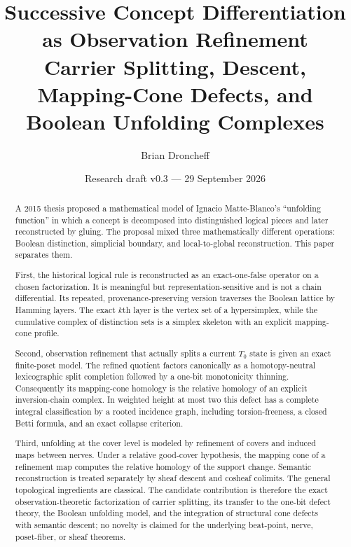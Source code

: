 \documentclass[11pt]{article}
\title{\textbf{Successive Concept Differentiation as Observation Refinement}\\
\large Carrier Splitting, Descent, Mapping-Cone Defects, and Boolean Unfolding Complexes}
\author{Brian Droncheff}
\date{Research draft v0.3 --- 29 September 2026}
\begin{document}
\maketitle

\begin{abstract}
A 2015 thesis proposed a mathematical model of Ignacio Matte-Blanco's ``unfolding function'' in which a concept is decomposed into distinguished logical pieces and later reconstructed by gluing.  The proposal mixed three mathematically different operations: Boolean distinction, simplicial boundary, and local-to-global reconstruction.  This paper separates them.

First, the historical logical rule is reconstructed as an exact-one-false operator on a chosen factorization.  It is meaningful but representation-sensitive and is not a chain differential.  Its repeated, provenance-preserving version traverses the Boolean lattice by Hamming layers.  The exact $k$th layer is the vertex set of a hypersimplex, while the cumulative complex of distinction sets is a simplex skeleton with an explicit mapping-cone profile.

Second, observation refinement that actually splits a current $T_0$ state is given an exact finite-poset model.  The refined quotient factors canonically as a homotopy-neutral lexicographic split completion followed by a one-bit monotonicity thinning.  Consequently its mapping-cone homology is the relative homology of an explicit inversion-chain complex.  In weighted height at most two this defect has a complete integral classification by a rooted incidence graph, including torsion-freeness, a closed Betti formula, and an exact collapse criterion.

Third, unfolding at the cover level is modeled by refinement of covers and induced maps between nerves.  Under a relative good-cover hypothesis, the mapping cone of a refinement map computes the relative homology of the support change.  Semantic reconstruction is treated separately by sheaf descent and cosheaf colimits.  The general topological ingredients are classical.  The candidate contribution is therefore the exact observation-theoretic factorization of carrier splitting, its transfer to the one-bit defect theory, the Boolean unfolding model, and the integration of structural cone defects with semantic descent; no novelty is claimed for the underlying beat-point, nerve, poset-fiber, or sheaf theorems.
\end{abstract}

\tableofcontents
\end{document}
